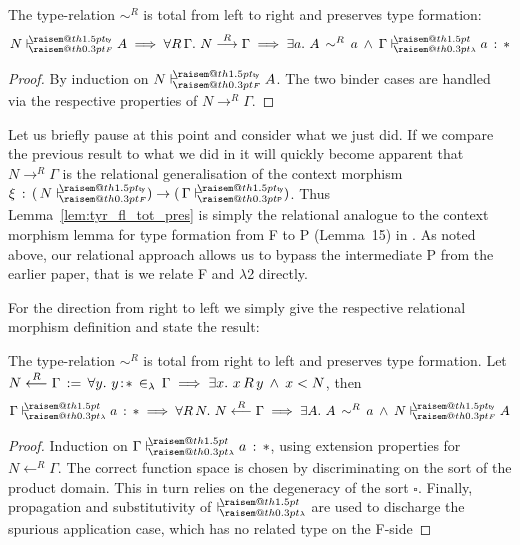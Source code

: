 \documentclass[a4paper,UKenglish]{lipics-v2016}
\makeatletter
\newcommand{\ms}{\,}
\newcommand{\mrel}[1]{\mathrel{\ms #1 \ms}}
\newcommand{\OF}{\mrel{:}}
\newcommand{\mAnd}{\mrel{\wedge}}
\newcommand{\mAll}[1]{\ensuremath{\forall} #1.\ms\ms}
\newcommand{\mEx}[1]{\ensuremath{\exists} #1.\ms\ms}
\newcommand{\eqdef}{\mrel{:=}}
\newcommand{\SysL}{$\lambda$2\xspace}
\newcommand{\ty}{\mathsf{ty}}
\newcommand{\of}{\ensuremath{\!:\!}}
\newcommand{\raisemath}[1]{\mathpalette{\raisem@th{#1}}}
\newcommand{\raisem@th}[3]{\raisebox{#1}{\ensuremath{#2#3}}}
\newcommand{\tsAnnot}[2]{\vdash\hspace{-.7em}^{\raisemath{1.5pt}{\scriptscriptstyle{#2}}}_{\raisemath{0.3pt}{\scriptscriptstyle{#1}}}} %
\newcommand{\cts}[2]{\ensuremath{(\,#1 #2 {})}} %
\newcommand{\tfF}{\tsAnnot{F}{\ty}}  %
\newcommand{\istyF}[2]{\ensuremath{{#1} \mathrel{\tfF} #2}}
\newcommand{\tyL}{\tsAnnot{\lambda}{}} %
\newcommand{\typingL}[3]{\ensuremath{{#1} \mathrel{\tyL} #2 \OF #3}}
\newcommand{\inL}{\mrel{\in_{\lambda}}}
\newcommand{\tfP}{\tsAnnot{\mathsf{P}}{\ty}}  %
\newcommand{\tyr}{\mathrel{\sim}}
\newcommand{\tyctxrelFL}[3]{\ensuremath{#1\mathrel{\mathop{\longrightarrow}^{#2}\limits}#3}}
\newcommand{\tyctxrelLF}[3]{\ensuremath{#1\mathrel{\mathop{\longleftarrow}^{#2}\limits}#3}}
\newcommand{\Prp}{\ensuremath{\textrm{\textasteriskcentered}}}
\newcommand{\Typ}{\ensuremath{\square}}
\makeatother
\begin{document}
\begin{lemma}
  \label{lem:tyr_fl_tot_pres}
  The type-relation $\tyr^R$ is total from left to right and preserves type formation:
  \begin{align*}
    \istyF{N}{A} \implies \mAll {R\,\Gamma} \tyctxrelFL{N}{R}{\Gamma} \implies \mEx a A\,\tyr^R\,a \mAnd \typingL{\Gamma}{a}{\Prp}
  \end{align*}
\end{lemma}
\begin{proof}
  By induction on $\istyF{N}{A}$. The two binder cases are handled via the respective properties of $\tyctxrelFL{N}{R}{\Gamma}$.
\end{proof}
Let us briefly pause at this point and consider what we just did.
If we compare the previous result to what we did in \cite{KaiserEtAl:2017:sysf_pts_equiv_coq} it will quickly become apparent that $\tyctxrelFL{N}{R}{\Gamma}$ is the relational generalisation of the context morphism $\xi\ms:\ms\cts{N}{\tfF}\to\cts{\Gamma}{\tfP}$.
Thus Lemma~\ref{lem:tyr_fl_tot_pres} is simply the relational analogue to the context morphism lemma for type formation from F to P (Lemma~15) in \cite{KaiserEtAl:2017:sysf_pts_equiv_coq}.
As noted above, our relational approach allows us to bypass the intermediate P from the earlier paper, that is we relate F and \SysL directly.

For the direction from right to left we simply give the respective relational morphism definition and state the result:
\begin{lemma}
  \label{lem:tyr_lf_tot_pres}
  The type-relation $\tyr^R$ is total from right to left and preserves type formation.
  Let $\tyctxrelLF{N}{R}{\Gamma} \eqdef \mAll {y} y\of\Prp \inL \Gamma \implies \mEx x x\,R\,y \mAnd x < N$, then
  \begin{align*}
    \typingL{\Gamma}{a}{\Prp} \implies \mAll {R\,N} \tyctxrelLF{N}{R}{\Gamma} \implies \mEx A A\,\tyr^R\,a \mAnd \istyF{N}{A}
  \end{align*}
\end{lemma}
\begin{proof}
  Induction on $\typingL{\Gamma}{a}{\Prp}$, using extension properties for $\tyctxrelLF{N}{R}{\Gamma}$.
  The correct function space is chosen by discriminating on the sort of the product domain.
  This in turn relies on the degeneracy of the sort $\Typ$.
  Finally, propagation and substitutivity of $\tyL$ are used to discharge the spurious application case, which has no related type on the F-side
\end{proof}
\end{document}
